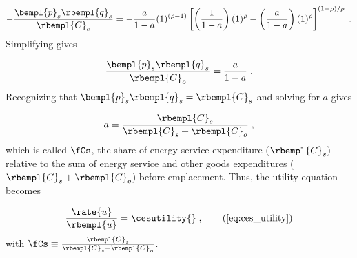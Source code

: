 \begin{equation}
  - \frac{\bempl{p}_s \rbempl{q}_s}{\rbempl{C}_o} =
        -\frac{a}{1 - a} (1)^{(\rho -1)}
        \left[ \left( \frac{1}{1 - a} \right) (1)^\rho
                - \left( \frac{a}{1 - a} \right) 
                          (1)^\rho \right]^{(1 - \rho)/\rho} \; .
\end{equation}
%
Simplifying gives

\begin{equation}
  \frac{\bempl{p}_s \rbempl{q}_s}{\rbempl{C}_o} = \frac{a}{1 - a} \; .
\end{equation}
%
Recognizing that $\bempl{p}_s \rbempl{q}_s = \rbempl{C}_s$ and solving for
$a$ gives

\begin{equation}
  a = \frac{\rbempl{C}_s}{\rbempl{C}_s + \rbempl{C}_o} \; ,
\end{equation}
%
which is called $\fCs$, 
the share of energy service expenditure ($\rbempl{C}_s$) 
relative to the sum of energy service and other goods expenditures 
($\rbempl{C}_s + \rbempl{C}_o$) 
before emplacement.
Thus, the utility equation becomes

\begin{equation} 
    \frac{\rate{u}}{\rbempl{u}} = \cesutility{} \; , \tag{\ref{eq:ces_utility}}
\end{equation}
%
with $\fCs \equiv \frac{\rbempl{C}_s}{\rbempl{C}_s + \rbempl{C}_o}$.

